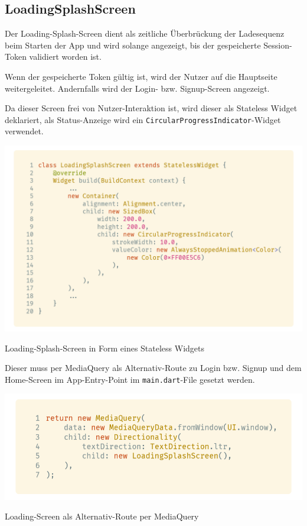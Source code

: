 \subsection{LoadingSplashScreen}

Der Loading-Splash-Screen dient als zeitliche Überbrückung der Ladesequenz beim Starten der App und
wird solange angezeigt, bis der gespeicherte Session-Token validiert worden ist.

Wenn der gespeicherte Token gültig ist, wird der Nutzer auf die Hauptseite weitergeleitet. Andernfalls wird der Login- bzw. Signup-Screen angezeigt.

Da dieser Screen frei von Nutzer-Interaktion ist, wird dieser als Stateless Widget deklariert,
als Status-Anzeige wird ein \lstinline{CircularProgressIndicator}-Widget verwendet.

\begin{code}[H]
    \centering
    \includegraphics[width=1\textwidth]{images/Client/screens/loading/loadingWidget.png}
    \caption{Loading-Splash-Screen in Form eines Stateless Widgets}
\end{code}

\newpage

Dieser muss per MediaQuery als Alternativ-Route zu Login bzw. Signup und dem Home-Screen im App-Entry-Point
im \lstinline{main.dart}-File gesetzt werden.

\begin{code}[H]
    \centering
    \includegraphics[width=1\textwidth]{images/Client/screens/loading/loadingScreen.png}
    \caption{Loading-Screen als Alternativ-Route per MediaQuery}
\end{code}